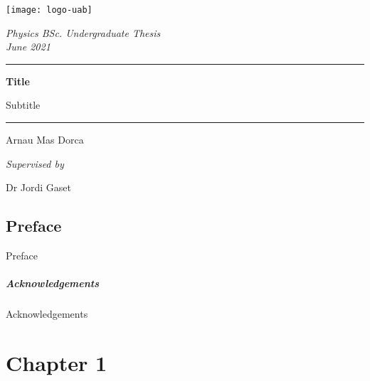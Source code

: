 \documentclass[12pt, oneside]{book}
\title{}
\author{Arnau Mas}
\date{}
\begin{document}
\begin{titlepage}
	\centering \sffamily

	\vspace*{2cm}

	\texttt{[image: logo-uab]}

	\vspace{2cm}

	{\Large \itshape Physics BSc. Undergraduate Thesis} \\
	{\large \itshape June 2021}

	\vspace{10pt}
	\hrule
	\vspace{10pt}
	{\bfseries \LARGE Title}

	{\Large Subtitle}
	\vspace{10pt}
	\hrule		
	\vspace{2cm}

	{\LARGE Arnau Mas Dorca}

	\vspace{1cm}
	{\large \itshape Supervised by}

	{\Large Dr Jordi Gaset}
\end{titlepage}
\thispagestyle{empty}

\pagestyle{plain}
\frontmatter
{\footnotesize \sffamily \tableofcontents}

\pagebreak
{}
\section*{Preface}
Preface

\paragraph{Acknowledgements}
Acknowledgements

\mainmatter
\pagestyle{main}

\chapter{Chapter 1}\label{ch:problem}


\backmatter
\pagestyle{plain}
\printbibliography
\end{document}
